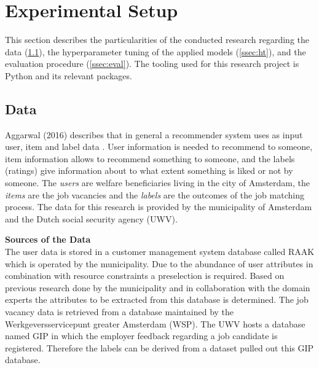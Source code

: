 \section{Experimental Setup}
\label{sec:setup}
This section describes the particularities of the conducted research regarding the data (\ref{ssec:data}), the hyperparameter tuning of the applied models (\ref{ssec:ht}), and the evaluation procedure (\ref{ssec:eval}). 
The tooling used for this research project is Python and its relevant packages.

\subsection{Data}
\label{ssec:data}
Aggarwal (2016) describes that in general a recommender system uses as input user, item and label data \cite{aggarwal2016recommender}.
User information is needed to recommend to someone, item information allows to recommend something to someone, and the labels (ratings) give information about to what extent  something is liked or not by someone.
The \textit{users} are welfare beneficiaries living in the city of Amsterdam, the \textit{items} are the job vacancies and the \textit{labels} are the outcomes of the job matching process.
The data for this research is provided by the municipality of Amsterdam and the Dutch social security agency (UWV).

\noindent
\textbf{Sources of the Data}\\
The user data is stored in a customer management system database called RAAK which is operated by the municipality.
Due to the abundance of user attributes in combination with resource constraints a preselection is required. 
Based on previous research done by the municipality and in collaboration with the domain experts the attributes to be extracted from this database is determined. 
The job vacancy data is retrieved from a database maintained by the Werkgeversservicepunt greater Amsterdam (WSP).
The UWV hosts a database named GIP in which the employer feedback regarding a job candidate is registered.
Therefore the labels can be derived from a dataset pulled out this GIP database.

